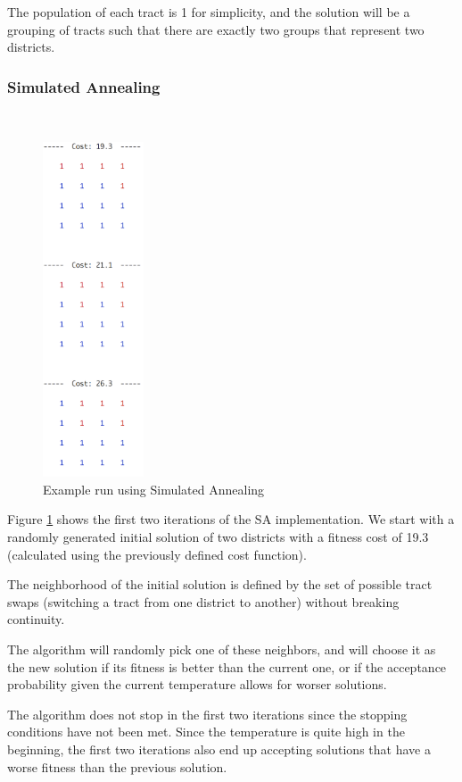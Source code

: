 \documentclass[journal]{IEEEtran}
\begin{document}
The population of each tract is 1 for simplicity, and the solution will be a grouping of tracts such that there are exactly two groups that represent two districts. \\

\subsubsection{Simulated Annealing}~\\
\begin{figure}[h!]
    \includegraphics[width=3cm]{sa.png}
    \centering
    \caption{Example run using Simulated Annealing}
        \label{fig:sa_example}
\end{figure}

Figure \ref{fig:sa_example} shows the first two iterations of the SA implementation.
We start with a randomly generated initial solution of two districts with a fitness cost of 19.3 (calculated using the previously defined cost function).

The neighborhood of the initial solution is defined by the set of possible tract swaps (switching a tract from one district to another) without breaking continuity.

The algorithm will randomly pick one of these neighbors, and will choose it as the new solution if its fitness is better than the current one, or if the acceptance probability given the current temperature allows for worser solutions.

The algorithm does not stop in the first two iterations since the stopping conditions have not been met. Since the temperature is quite high in the beginning, the first two iterations also end up accepting solutions that have a worse fitness than the previous solution. \\
\end{document}
